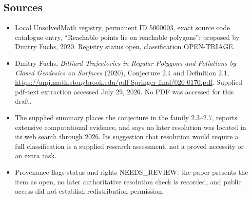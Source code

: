\documentclass[11pt]{article}
\begin{document}
\subsection{Sources}
\begin{itemize}
\item Local UnsolvedMath registry, permanent ID 5000003, exact source code catalogue entry, ``Reachable points lie on reachable polygons''; proposed by Dmitry Fuchs, 2020. Registry status open, classification OPEN-TRIAGE.
\item Dmitry Fuchs, \emph{Billiard Trajectories in Regular Polygons and Foliations by Closed Geodesics on Surfaces} (2020), Conjecture 2.4 and Definition 2.1, \url{https://amj.math.stonybrook.edu/pdf-Springer-final/020-0170.pdf}. Supplied pdf-text extraction accessed July 29, 2026. No PDF was accessed for this draft.
\item The supplied summary places the conjecture in the family 2.3--2.7, reports extensive computational evidence, and says no later resolution was located in its web search through 2026. Its suggestion that resolution would require a full classification is a supplied research assessment, not a proved necessity or an extra task.
\item Provenance flags status and rights NEEDS\_REVIEW: the paper presents the item as open, no later authoritative resolution check is recorded, and public access did not establish redistribution permission.
\end{itemize}
\end{document}
